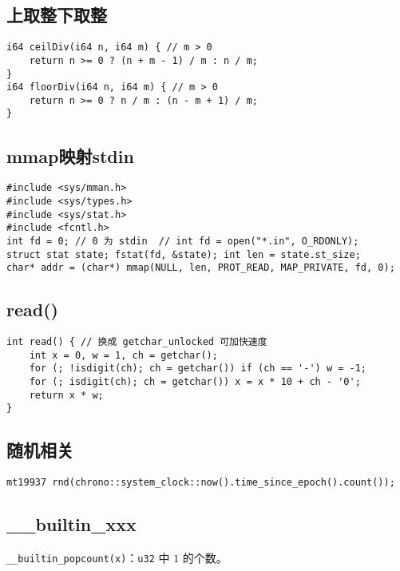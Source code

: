 \documentclass[a4paper,landscape,twocolumn]{ctexart}
\begin{document}
\subsection{上取整下取整}

\begin{lstlisting}
i64 ceilDiv(i64 n, i64 m) { // m > 0
	return n >= 0 ? (n + m - 1) / m : n / m;
}
i64 floorDiv(i64 n, i64 m) { // m > 0
	return n >= 0 ? n / m : (n - m + 1) / m;
}
\end{lstlisting}

\subsection{mmap映射stdin}

\begin{lstlisting}
#include <sys/mman.h>
#include <sys/types.h>
#include <sys/stat.h>
#include <fcntl.h>
int fd = 0; // 0 为 stdin  // int fd = open("*.in", O_RDONLY);
struct stat state; fstat(fd, &state); int len = state.st_size;
char* addr = (char*) mmap(NULL, len, PROT_READ, MAP_PRIVATE, fd, 0);
\end{lstlisting}

\subsection{read()}

\begin{lstlisting}
int read() { // 换成 getchar_unlocked 可加快速度
	int x = 0, w = 1, ch = getchar();
	for (; !isdigit(ch); ch = getchar()) if (ch == '-') w = -1;
	for (; isdigit(ch); ch = getchar()) x = x * 10 + ch - '0';
	return x * w;
}
\end{lstlisting}

\subsection{随机相关}

\begin{lstlisting}
mt19937 rnd(chrono::system_clock::now().time_since_epoch().count());
\end{lstlisting}

\subsection{\_\_builtin\_xxx}

\texttt{\_\_builtin\_popcount{\color{red}{ll}}(x)}：\texttt{u32{\color{red}{/u64}}} 中 $1$ 的个数。
\end{document}
